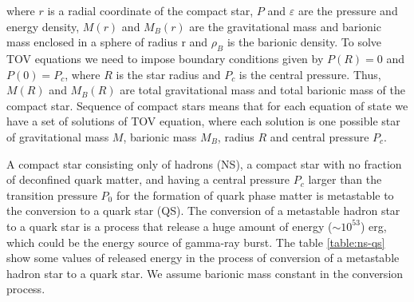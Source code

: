 \documentclass[prc, reprint, amsmath, floatfix,10pt]{revtex4-1}
\begin{document}
where $r$ is a radial coordinate of the compact star, $P$ and $\varepsilon$ are the
pressure and energy density, $M(r)$ and $M_B(r)$ are the gravitational mass and barionic
mass enclosed in a sphere of radius r and $\rho_B$ is the barionic density. To solve TOV
equations we need to impose boundary conditions given by $P(R)=0$ and $P(0)=P_c$,
where $R$ is the star radius and $P_c$ is the central pressure. 
Thus, $M(R)$ and $M_B(R)$ are total gravitational mass and total barionic
mass of the compact star. Sequence of compact stars means that for each equation of state we have 
a set of solutions of TOV equation, where each solution is one possible star of gravitational
mass $M$, barionic mass $M_B$, radius $R$ and central pressure $P_c$.

A compact star consisting only of hadrons (NS), a compact star with no fraction of 
deconfined quark matter, and having a central pressure $P_c$ larger than the transition
pressure $P_0$ for the formation of quark phase matter is metastable 
\cite{2002NuPhS.113..268B, 2003ApJ...586.1250B, 2004ApJ...614..314B} to the
conversion to a quark star (QS). The conversion of a metastable hadron star to a
quark star is a process that release a huge amount of energy ($\sim 10^{53}$) erg, which could
be the energy source of gamma-ray burst. The table \ref{table:ns-qs} show some values of
released energy in the process of conversion of a metastable hadron star to a quark star.
We assume barionic mass constant in the conversion process.
\end{document}
